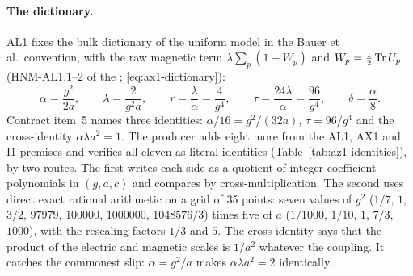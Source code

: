 \paragraph{The dictionary.}
AL1 fixes the bulk dictionary of the uniform model in the Bauer et al.\
convention, with the raw magnetic term $\lambda\sum_p(1-W_p)$ and
$W_p=\tfrac12\operatorname{Tr} U_p$ (HNM-AL1.1--2 of the
;
\eqref{eq:ax1-dictionary}):
\begin{equation}
 \alpha=\frac{g^2}{2a},\qquad\lambda=\frac2{g^2a},\qquad
 r=\frac\lambda\alpha=\frac4{g^4},\qquad
 \tau=\frac{24\lambda}\alpha=\frac{96}{g^4},\qquad\delta=\frac\alpha8 .
 \label{eq:az1-dictionary}
\end{equation}
Contract item~5 names three identities: $\alpha/16=g^2/(32a)$,
$\tau=96/g^4$ and the cross-identity $\alpha\lambda a^2=1$. The producer adds
eight more from the AL1, AX1 and I1 premises and verifies all eleven as
literal identities (Table~\ref{tab:az1-identities}), by two routes. The first
writes each side as a quotient of integer-coefficient polynomials in
$(g,a,c)$ and compares by cross-multiplication. The second uses direct exact
rational arithmetic on a grid of 35 points: seven values of $g^2$ ($1/7$, $1$,
$3/2$, $97979$, $100000$, $1000000$, $1048576/3$) times five of $a$
($1/1000$, $1/10$, $1$, $7/3$, $1000$), with the rescaling factors $1/3$ and
$5$. The cross-identity says that the product of the electric and magnetic
scales is $1/a^2$ whatever the coupling. It catches the commonest slip:
$\alpha=g^2/a$ makes $\alpha\lambda a^2=2$ identically.

